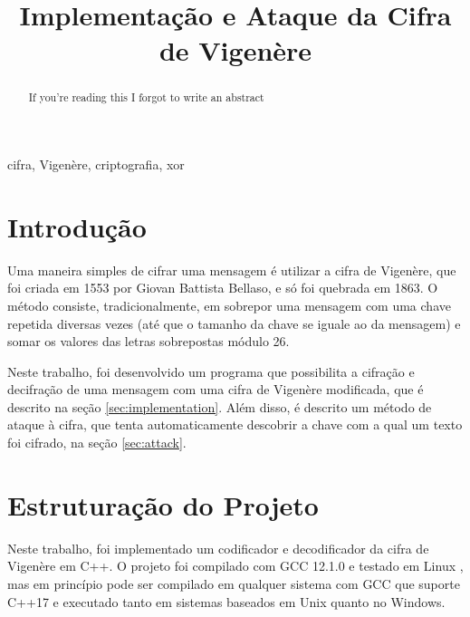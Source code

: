 \documentclass[conference]{IEEEtran}
\begin{document}
\title{Implementação e Ataque da Cifra de Vigenère}

\author{
}

\maketitle

\begin{abstract}
    If you're reading this I forgot to write an abstract
\end{abstract}

\begin{IEEEkeywords}
    cifra, Vigenère, criptografia, xor
\end{IEEEkeywords}

\section{Introdução} %
Uma maneira simples de cifrar uma mensagem é utilizar a cifra de Vigenère, que
foi criada em 1553 por Giovan Battista Bellaso, e só foi quebrada em 1863. O
método consiste, tradicionalmente, em sobrepor uma mensagem com uma chave
repetida diversas vezes (até que o tamanho da chave se iguale ao da mensagem) e
somar os valores das letras sobrepostas módulo 26.

Neste trabalho, foi desenvolvido um programa que possibilita a cifração e
decifração de uma mensagem com uma cifra de Vigenère modificada, que é
descrito na seção \ref{sec:implementation}. Além disso, é descrito um método de
ataque à cifra, que tenta automaticamente descobrir a chave com a qual um texto
foi cifrado, na seção \ref{sec:attack}.


\section{Estruturação do Projeto} %
Neste trabalho, foi implementado um codificador e decodificador da cifra de
Vigenère em C++. O projeto foi compilado com GCC 12.1.0 e testado em Linux , mas
em princípio pode ser compilado em qualquer sistema com GCC que suporte C++17 e
executado tanto em sistemas baseados em Unix quanto no Windows. 
\end{document}
